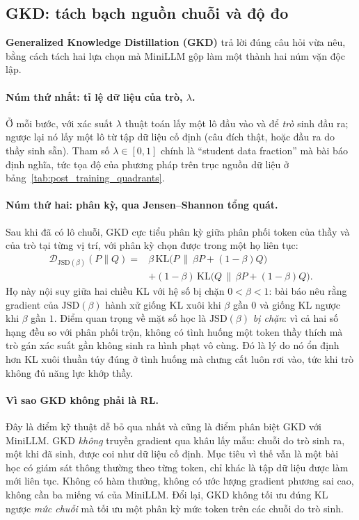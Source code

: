\subsection{GKD: tách bạch nguồn chuỗi và độ đo}
\label{ssec:gkd}

\textbf{Generalized Knowledge Distillation (GKD)} \cite{agarwal2024gkd} trả lời đúng câu hỏi vừa nêu, bằng cách tách hai lựa chọn mà MiniLLM gộp làm một thành hai núm vặn độc lập.

\paragraph{Núm thứ nhất: tỉ lệ dữ liệu của trò, $\lambda$.} Ở mỗi bước, với xác suất $\lambda$ thuật toán lấy một lô đầu vào và để \emph{trò} sinh đầu ra; ngược lại nó lấy một lô từ tập dữ liệu cố định (câu đích thật, hoặc đầu ra do thầy sinh sẵn). Tham số $\lambda\in[0,1]$ chính là ``student data fraction'' mà bài báo định nghĩa, tức tọa độ của phương pháp trên trục nguồn dữ liệu ở bảng~\ref{tab:post_training_quadrants}.

\paragraph{Núm thứ hai: phân kỳ, qua Jensen--Shannon tổng quát.} Sau khi đã có lô chuỗi, GKD cực tiểu phân kỳ giữa phân phối token của thầy và của trò tại từng vị trí, với phân kỳ chọn được trong một họ liên tục:
\[
\begin{aligned}
\mathcal{D}_{\mathrm{JSD}(\beta)}(P\|Q) = {}& \beta\,\mathrm{KL}\big(P \,\big\|\, \beta P + (1-\beta)Q\big)\\
&+ (1-\beta)\,\mathrm{KL}\big(Q \,\big\|\, \beta P + (1-\beta)Q\big).
\end{aligned}
\]
Họ này nội suy giữa hai chiều KL với hệ số bị chặn $0<\beta<1$: bài báo nêu rằng gradient của $\mathrm{JSD}(\beta)$ hành xử giống KL xuôi khi $\beta$ gần $0$ và giống KL ngược khi $\beta$ gần $1$. Điểm quan trọng về mặt số học là $\mathrm{JSD}(\beta)$ \emph{bị chặn}: vì cả hai số hạng đều so với phân phối trộn, không có tình huống một token thầy thích mà trò gán xác suất gần không sinh ra hình phạt vô cùng. Đó là lý do nó ổn định hơn KL xuôi thuần túy đúng ở tình huống mà chưng cất luôn rơi vào, tức khi trò không đủ năng lực khớp thầy.

\paragraph{Vì sao GKD không phải là RL.} Đây là điểm kỹ thuật dễ bỏ qua nhất và cũng là điểm phân biệt GKD với MiniLLM. GKD \emph{không} truyền gradient qua khâu lấy mẫu: chuỗi do trò sinh ra, một khi đã sinh, được coi như dữ liệu cố định. Mục tiêu vì thế vẫn là một bài học có giám sát thông thường theo từng token, chỉ khác là tập dữ liệu được làm mới liên tục. Không có hàm thưởng, không có ước lượng gradient phương sai cao, không cần ba miếng vá của MiniLLM. Đổi lại, GKD không tối ưu đúng KL ngược \emph{mức chuỗi} mà tối ưu một phân kỳ mức token trên các chuỗi do trò sinh.

